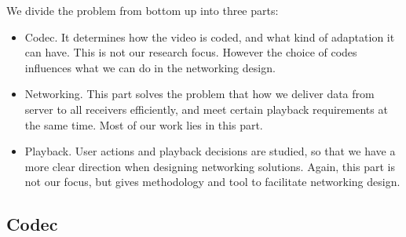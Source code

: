 \documentclass[11pt,a4paper]{article}
\begin{document}
We divide the problem from bottom up into three parts:
\begin{itemize}
	\item Codec. It determines how the video is coded, 
	and what kind of adaptation it can have. 
	This is not our research focus. However the 
	choice of codes influences what we can do in the networking
	design. 
	\item Networking. This part solves the problem that how we
	deliver data from server to all receivers efficiently, and 
	meet certain playback requirements at the same time. Most 
	of our work lies in this part. 
	\item Playback. User actions and playback decisions are 
	studied, so that we have a more clear direction when designing 
	networking solutions. Again, this part is not our focus, but 
	gives methodology and tool to facilitate networking design. 
\end{itemize}

\subsection{Codec}
\end{document}
